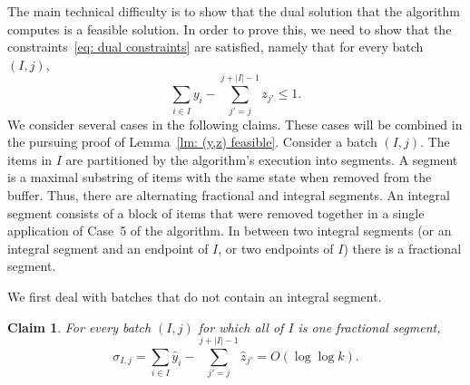 \documentclass[12pt]{article}
\newtheorem{claim}[theorem]{Claim}
\begin{document}
The main technical difficulty is to show that the dual solution that the
algorithm computes is a feasible solution.
In order to prove this, we need to show that
the constraints~\eqref{eq: dual constraints} are satisfied, namely that
for every batch $(I,j)$,
$$
\sum_{i\in I}y_{i}-\sum_{j'=j}^{j+|I|-1}z_{j'} \le 1.
$$
We consider several cases in the following claims. These cases will be
combined in the pursuing proof of Lemma~\ref{lm: (y,z) feasible}.
Consider a batch $(I,j)$. The items in $I$ are partitioned by the
algorithm's execution into segments. A segment is a maximal
substring of items with the same state when removed from the
buffer. Thus, there are alternating fractional and integral segments.
An integral segment consists of a block of items that were removed
together in a single application of Case~5 of the algorithm. In
between two integral segments (or an integral segment and an
endpoint of $I$, or two endpoints of $I$) there is a fractional
segment.

We first deal with batches that do not contain an integral
segment.
\begin{claim}\label{cl: fractional batch}
For every batch $(I,j)$ for which all of $I$ is one fractional segment,
$$
\sigma_{I,j} = \sum_{i\in I}\hat{y}_{i}-\sum_{j'=j}^{j+|I|-1}\hat{z}_{j'} 
= O(\log \log k).
$$
\end {claim}
\end{document}

